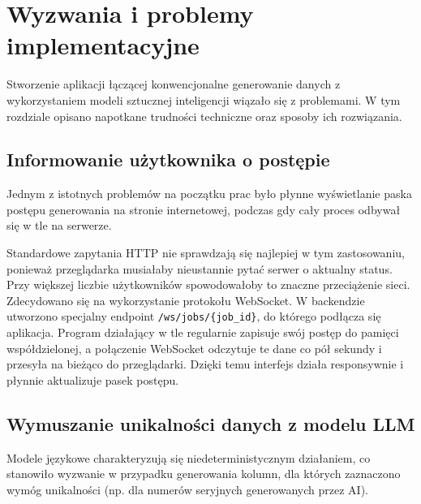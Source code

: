 \chapter{Wyzwania i problemy implementacyjne}

Stworzenie aplikacji łączącej konwencjonalne generowanie danych z wykorzystaniem modeli sztucznej inteligencji wiązało się z problemami. W tym rozdziale opisano napotkane trudności techniczne oraz sposoby ich rozwiązania.

\section{Informowanie użytkownika o postępie}
Jednym z istotnych problemów na początku prac było płynne wyświetlanie paska postępu generowania na stronie internetowej, podczas gdy cały proces odbywał się w tle na serwerze.

Standardowe zapytania \gls{HTTP} nie sprawdzają się najlepiej w tym zastosowaniu, ponieważ przeglądarka musiałaby nieustannie pytać serwer o aktualny status. Przy większej liczbie użytkowników spowodowałoby to znaczne przeciążenie sieci. Zdecydowano się na wykorzystanie protokołu WebSocket. W backendzie utworzono specjalny endpoint \texttt{/ws/jobs/\{job\_id\}}, do którego podłącza się aplikacja. Program działający w tle regularnie zapisuje swój postęp do pamięci współdzielonej, a połączenie WebSocket odczytuje te dane co pół sekundy i przesyła na bieżąco do przeglądarki. Dzięki temu interfejs działa responsywnie i płynnie aktualizuje pasek postępu.

\section{Wymuszanie unikalności danych z modelu LLM}
Modele językowe charakteryzują się niedeterministycznym działaniem, co stanowiło wyzwanie w przypadku generowania kolumn, dla których zaznaczono wymóg unikalności (np. dla numerów seryjnych generowanych przez AI).

